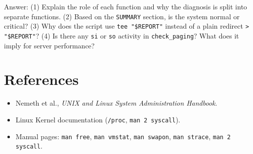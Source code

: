 Answer: (1) Explain the role of each function and why the diagnosis is split into
separate functions. (2) Based on the \texttt{SUMMARY} section, is the system normal
or critical? (3) Why does the script use \texttt{tee "\$REPORT"} instead of a plain
redirect \texttt{> "\$REPORT"}? (4) Is there any \texttt{si} or \texttt{so} activity
in \texttt{check\_paging}? What does it imply for server performance?

\section{References}

\begin{itemize}
    \item Nemeth et al., \textit{UNIX and Linux System Administration Handbook}.
    \item Linux Kernel documentation (\texttt{/proc}, \texttt{man 2 syscall}).
    \item Manual pages: \texttt{man free}, \texttt{man vmstat}, \texttt{man swapon},
    \texttt{man strace}, \texttt{man 2 syscall}.
\end{itemize}
